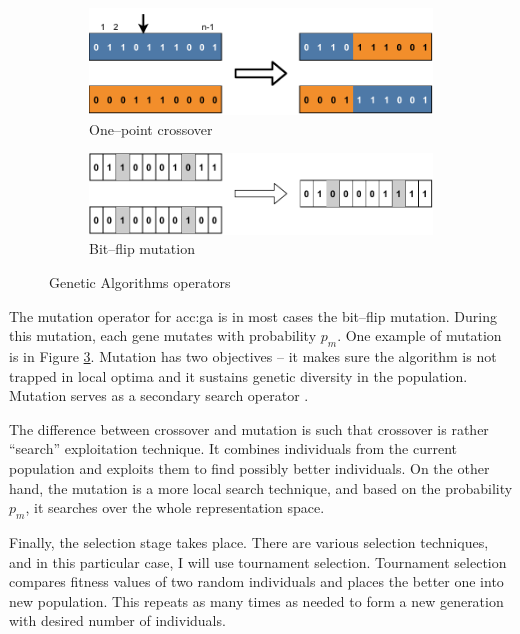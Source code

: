 \begin{figure}
    \begin{subfigure}[b]{0.4\textwidth}
        \includegraphics[width=\textwidth]{img/master_onepointcrossover.pdf}
        \caption{One--point crossover}
        \label{fig:gaonepointcrossover}
    \end{subfigure}
    \hfill
    \begin{subfigure}[b]{0.4\textwidth}
        \includegraphics[width=\textwidth]{img/master_bitflipmutation.pdf}
        \caption{Bit--flip mutation}
        \label{fig:bitflipmutation}
    \end{subfigure}
    \caption{Genetic Algorithms operators}
\end{figure}

The mutation operator for \acrshort{acc:ga} is in most cases the bit--flip mutation. During this mutation, each gene mutates with probability $p_m$. One example of mutation is in Figure \ref{fig:bitflipmutation}. Mutation has two objectives -- it makes sure the algorithm is not trapped in local optima and it sustains genetic diversity in the population. Mutation serves as a secondary search operator \citep{IntroToGA}.

The difference between crossover and mutation is such that crossover is rather \enquote{search} exploitation technique. It combines individuals from the current population and exploits them to find possibly better individuals. On the other hand, the mutation is a more local search technique, and based on the probability $p_m$, it searches over the whole representation space.

Finally, the selection stage takes place. There are various selection techniques, and in this particular case, I will use tournament selection. Tournament selection compares fitness values of two random individuals and places the better one into new population. This repeats as many times as needed to form a new generation with desired number of individuals.

